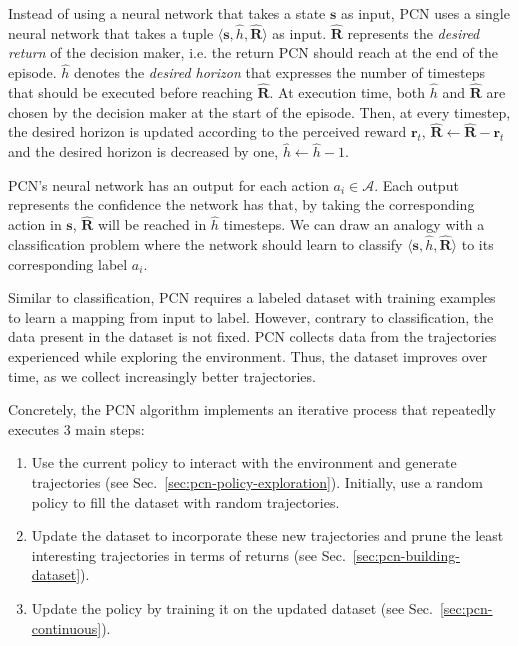 \documentclass{article}
\newcommand{\mdpstate}{\mathbf{s}}
\newcommand{\momdpreward}{\mathbf{r}}
\newcommand{\action}{a}
\newcommand{\ltuple}{\langle}
\newcommand{\rtuple}{\rangle}
\begin{document}
Instead of using a neural network that takes a state $\mdpstate$ as input, PCN uses a single neural network that takes a tuple $\ltuple \mdpstate, \hat{h}, \mathbf{\hat{R}} \rtuple$ as input. $\mathbf{\hat{R}}$ represents the \emph{desired return} of the decision maker, i.e. the return PCN should reach at the end of the episode. $\hat{h}$ denotes the \emph{desired horizon} that expresses the number of timesteps that should be executed before reaching $\mathbf{\hat{R}}$. At execution time, both $\hat{h}$ and $\mathbf{\hat{R}}$ are chosen by the decision maker at the start of the episode. Then, at every timestep, the desired horizon is updated according to the perceived reward $\momdpreward_t$, $\mathbf{\hat{R}} \leftarrow \mathbf{\hat{R}} - \momdpreward_t$ and the desired horizon is decreased by one, $\hat{h} \leftarrow \hat{h}-1$.

PCN's neural network has an output for each action $\action_i \in \mathcal{A}$. Each output represents the confidence the network has that, by taking the corresponding action in $\mdpstate$, $\mathbf{\hat{R}}$ will be reached in $\hat{h}$ timesteps. We can draw an analogy with a classification problem where the network should learn to classify $\ltuple \mdpstate, \hat{h}, \mathbf{\hat{R}}\rtuple$ to its corresponding label $\action_i$.

Similar to classification, PCN requires a labeled dataset with training examples to learn a mapping from input to label. However, contrary to classification, the data present in the dataset is not fixed. PCN collects data from the trajectories experienced while exploring the environment. Thus, the dataset improves over time, as we collect increasingly better trajectories.

Concretely, the PCN algorithm implements an iterative process that repeatedly executes 3 main steps:
\begin{enumerate}
    \item Use the current policy to interact with the environment and generate trajectories (see Sec.~\ref{sec:pcn-policy-exploration}). Initially, use a random policy to fill the dataset with random trajectories.
    \item Update the dataset to incorporate these new trajectories and prune the least interesting trajectories in terms of returns (see Sec.~\ref{sec:pcn-building-dataset}).
    \item Update the policy by training it on the updated dataset (see Sec.~\ref{sec:pcn-continuous}).
\end{enumerate}
\end{document}
